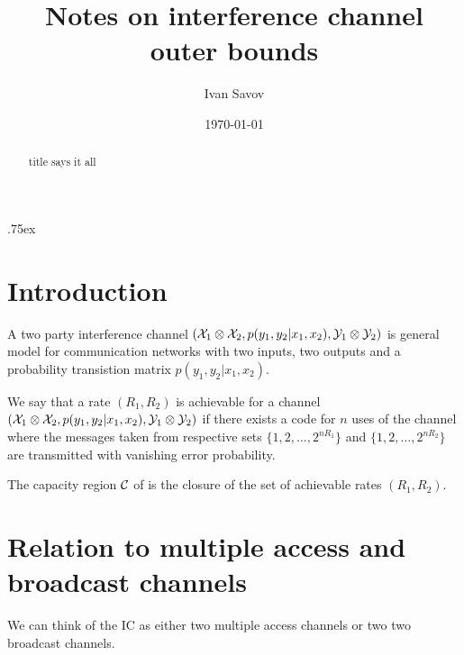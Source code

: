\documentclass[aps,11pt,twoside,letterpaper]{revtex4}
\begin{document}
\title{{\Large Notes on interference channel outer bounds} }
\date{\today} 
\author{Ivan Savov}



\begin{abstract}
    title says it all
\end{abstract}

\parskip .75ex             %
\maketitle


\section{Introduction}


    \begin{definition}
        A two party interference channel $({\cal X}_1 \otimes {\cal X}_2, p(y_1,y_2|x_1,x_2), {\cal Y}_1 \otimes {\cal Y}_2)$ 
        is general model for communication networks with two inputs, two outputs and a probability transistion
        matrix $p(y_1,y_2|x_1,x_2)$.
    \end{definition}
    
    \begin{definition}
        We say that a rate $(R_1,R_2)$ is achievable for a channel $({\cal X}_1 \otimes {\cal X}_2, p(y_1,y_2|x_1,x_2), {\cal Y}_1 \otimes {\cal Y}_2)$
        if there exists a code for $n$ uses of the channel where the messages taken from respective sets $\{1,2,\ldots,2^{nR_1} \}$ and
         $\{1,2,\ldots,2^{nR_2} \}$ are transmitted with vanishing error probability.
    \end{definition}
    
    
    \begin{definition}[Capacity]
        The capacity region ${\cal C}$ of is the closure of the set of achievable rates $(R_1,R_2)$.
    \end{definition}


\section{Relation to multiple access and broadcast channels}

    We can think of the IC as either two multiple access channels or
    two two broadcast channels.
    
\end{document}

